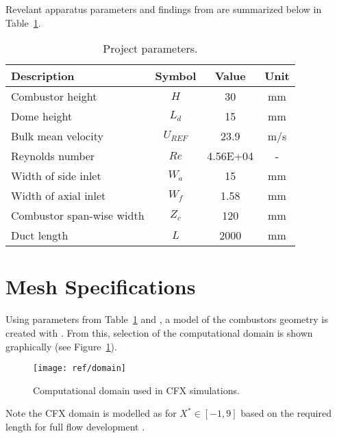 Revelant apparatus parameters and findings from \cite{art} are summarized below in Table~\ref{tab:param}.
\begin{table}[H]
	\centering
	\caption[Project parameters.]{Project parameters.\cite{art}}
	\begin{tabular}{lccc}
		\toprule
		\textbf{Description}      & \textbf{Symbol} & \textbf{Value} & \textbf{Unit} \\
		\midrule
		Combustor height          & $H$             & 30             & mm            \\
		Dome height               & $L_d$           & 15             & mm            \\
		Bulk mean velocity        & $U_{REF}$       & 23.9           & m/s           \\
		Reynolds number           & $Re$            & 4.56E+04       & -             \\
		Width of side inlet       & $W_a$           & 15             & mm            \\
		Width of axial inlet      & $W_f$           & 1.58           & mm            \\
		Combustor span-wise width & $Z_c$           & 120            & mm            \\
		Duct length               & $L$             & 2000           & mm            \\
		\bottomrule
	\end{tabular}
	\label{tab:param}
\end{table}

\section{Mesh Specifications}
\label{sec:pre_mesh}

Using parameters from Table~\ref{tab:param} and \cite{projfaq}, a model of the combustors geometry is created with \cite{sld}. From this, selection of the computational domain is shown graphically (see Figure~\ref{fig:domain}).
\begin{figure}[H]
	\centering
	\texttt{[image: ref/domain]}
	\caption[Computational domain used in CFX simulations.]{Computational domain used in CFX simulations. \cite{sld}}
	\label{fig:domain}
\end{figure}

Note the CFX domain is modelled as for $X^* \in [-1,9]$ based on the required length for full flow development \cite{art}.\\


